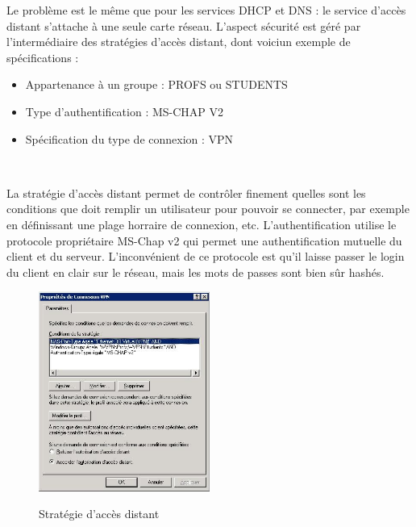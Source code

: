Le problème est le même que pour les services DHCP et DNS : le service d'accès distant s'attache à une seule carte réseau.
L'aspect sécurité est géré par l'intermédiaire des stratégies d'accès distant, dont voiciun exemple de spécifications :

\begin{itemize}
 	\item Appartenance à un groupe : PROFS ou STUDENTS
	\item Type d'authentification : MS-CHAP V2
	\item Spécification du type de connexion : VPN
\end{itemize}
~

La stratégie d'accès distant permet de contrôler finement quelles sont les conditions que doit remplir un utilisateur pour pouvoir se connecter, par exemple en définissant une plage horraire de connexion, etc. L'authentification utilise le protocole propriétaire MS-Chap v2 qui permet une authentification mutuelle du client et du serveur. L'inconvénient de ce protocole est qu'il laisse passer le login du client en clair sur le réseau, mais les mots de passes sont bien sûr hashés.

\begin{figure}[H]
	\begin{center}
		\includegraphics[width=0.50\textwidth]{partie_2/screen_windows/strat.png}\\
	\end{center}
	\caption{Stratégie d'accès distant}
	\label{VPN_STRAT}
\end{figure}

